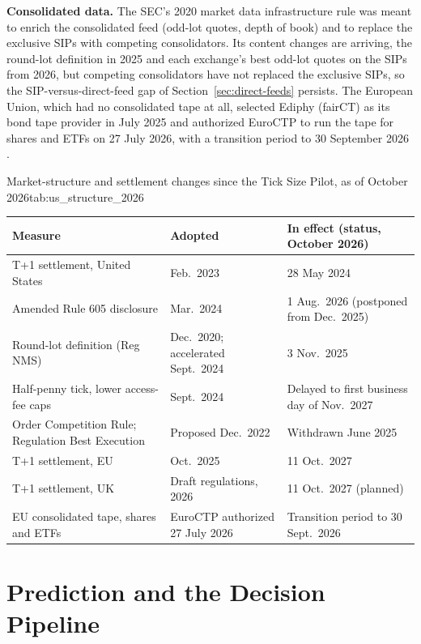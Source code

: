 \documentclass[../ai_in_finance]{subfiles}
\begin{document}
\textbf{Consolidated data.} The SEC's 2020 market data infrastructure rule \parencite{sec2020mdi} was meant to enrich the consolidated feed (odd-lot quotes, depth of book) and to replace the exclusive SIPs with competing consolidators. Its content changes are arriving, the round-lot definition in 2025 and each exchange's best odd-lot quotes on the SIPs from 2026, but competing consolidators have not replaced the exclusive SIPs, so the SIP-versus-direct-feed gap of Section~\ref{sec:direct-feeds} persists. The European Union, which had no consolidated tape at all, selected Ediphy (fairCT) as its bond tape provider in July 2025 and authorized EuroCTP to run the tape for shares and ETFs on 27 July 2026, with a transition period to 30 September 2026 \parencite{esma2026euroctp}.

\begin{booktable}[htbp]{Market-structure and settlement changes since the Tick Size Pilot, as of October 2026}{tab:us_structure_2026}
\small
\begin{tabular}{L{5.4cm}L{3.6cm}L{5.2cm}}
\toprule
Measure & Adopted & In effect (status, October 2026) \\
\midrule
T+1 settlement, United States & Feb.\ 2023 & 28 May 2024 \\
Amended Rule 605 disclosure & Mar.\ 2024 & 1 Aug.\ 2026 (postponed from Dec.\ 2025) \\
Round-lot definition (Reg NMS) & Dec.\ 2020; accelerated Sept.\ 2024 & 3 Nov.\ 2025 \\
Half-penny tick, lower access-fee caps & Sept.\ 2024 & Delayed to first business day of Nov.\ 2027 \\
Order Competition Rule; Regulation Best Execution & Proposed Dec.\ 2022 & Withdrawn June 2025 \\
T+1 settlement, EU & Oct.\ 2025 & 11 Oct.\ 2027 \\
T+1 settlement, UK & Draft regulations, 2026 & 11 Oct.\ 2027 (planned) \\
EU consolidated tape, shares and ETFs & EuroCTP authorized 27 July 2026 & Transition period to 30 Sept.\ 2026 \\
\bottomrule
\end{tabular}
\end{booktable}

\section{Prediction and the Decision Pipeline}
\end{document}
